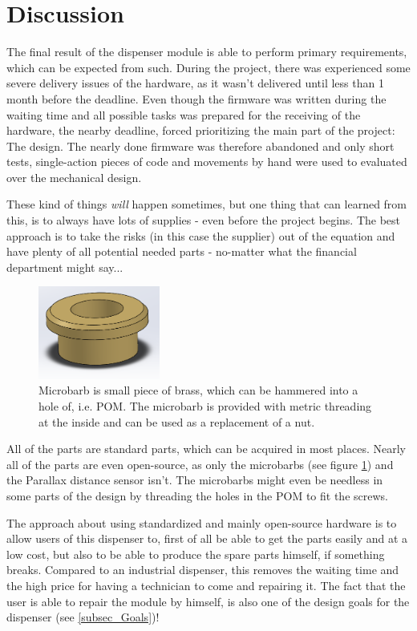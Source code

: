 \documentclass[10pt,a4paper]{article}
\begin{document}
	\section{Discussion}
		The final result of the dispenser module is able to perform primary requirements, which can be expected from such. During the project, there was experienced some severe delivery issues of the hardware, as it wasn't delivered until less than 1 month before the deadline. Even though the firmware was written during the waiting time and all possible tasks was prepared for the receiving of the hardware, the nearby deadline, forced prioritizing the main part of the project: The design. The nearly done firmware was therefore abandoned and only short tests, single-action pieces of code and movements by hand were used to evaluated over the mechanical design.
		
		These kind of things \textit{will} happen sometimes, but one thing that can learned from this, is to always have lots of supplies - even before the project begins. The best approach is to take the risks (in this case the supplier) out of the equation and have plenty of all potential needed parts - no-matter what the financial department might say...\\
		
		\begin{figure}
			\includegraphics[width=4cm]{images/microbarb.png}
			\caption{Microbarb is small piece of brass, which can be hammered into a hole of, i.e. POM. The microbarb is provided with metric threading at the inside and can be used as a replacement of a nut.}
			\label{fig::microbarb}
		\end{figure}
		
		All of the parts are standard parts, which can be acquired in most places. Nearly all of the parts are even open-source, as only the microbarbs (see figure \ref{fig::microbarb}) and the Parallax distance sensor isn't. The microbarbs might even be needless in some parts of the design by threading the holes in the POM to fit the screws.
		
		The approach about using standardized and mainly open-source hardware is to allow users of this dispenser to, first of all be able to get the parts easily and at a low cost, but also to be able to produce the spare parts himself, if something breaks. Compared to an industrial dispenser, this removes the waiting time and the high price for having a technician to come and repairing it. The fact that the user is able to repair the module by himself, is also one of the design goals for the dispenser (see \ref{subsec_Goals})!
		
\end{document}
